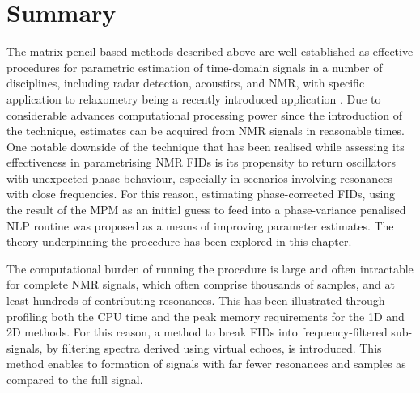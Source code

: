 \section{Summary}
The matrix pencil-based methods described above are well established as
effective procedures for parametric estimation of time-domain signals in a
number of disciplines, including radar detection\cite{Hua1994},
acoustics\cite{TODO}, and \ac{NMR}\cite{Lin1997}, with specific application to
relaxometry being a recently introduced application \cite{Fricke2020,
Wortge2023}. Due to considerable advances computational processing power since
the introduction of the technique, estimates can be acquired from \ac{NMR}
signals in reasonable times. One notable downside of the technique that has
been realised while assessing its effectiveness in parametrising \ac{NMR}
\ac{FID}s is its propensity to return oscillators with unexpected phase
behaviour, especially in scenarios involving resonances with close frequencies.
For this reason, estimating phase-corrected \acp{FID}, using the result of the
\ac{MPM} as an initial guess to feed into a phase-variance penalised \ac{NLP}
routine was proposed as a means of improving parameter estimates. The theory
underpinning the procedure has been explored in this chapter.

The computational burden of running the procedure is large and often
intractable for complete \ac{NMR} signals, which often comprise thousands of
samples, and at least hundreds of contributing resonances. This has been
illustrated through profiling both the \ac{CPU} time and the peak memory
requirements for the \ac{1D} and \ac{2D} methods.  For this reason, a method to break \acp{FID} into
frequency-filtered sub-signals, by filtering spectra derived using virtual
echoes, is introduced.  This method enables to formation of signals with far
fewer resonances and samples as compared to the full signal.


